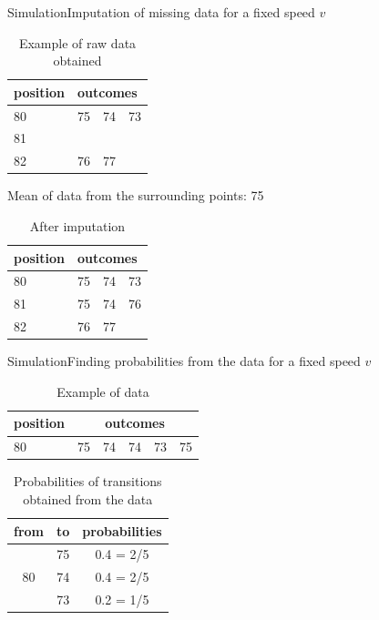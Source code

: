\documentclass[dvipsnames,svgnames]{beamer}
\begin{document}
\begin{frame}{Simulation}{Imputation of missing data for a fixed speed $v$}

\begin{table}[]
\centering
\caption{Example of raw data obtained}
\label{my-label}
\begin{tabular}{|l|l|l|l|}
\hline
position & \multicolumn{3}{l|}{outcomes} \\ \hline
80       & 75       & 74       & 73      \\ \hline
81       &          &          &         \\ \hline
82       & 76       & 77       &         \\ \hline
\end{tabular}
\end{table}

\pause 
Mean of data from the surrounding points: 75
\pause
\begin{table}[]
\centering
\caption{After imputation}
\label{my-label}
\begin{tabular}{|l|l|l|l|}
\hline
position & \multicolumn{3}{l|}{outcomes} \\ \hline
80       & 75       & 74       & 73      \\ \hline
81       & 75       & 74       &76        \\ \hline
82       & 76       & 77       &         \\ \hline
\end{tabular}
\end{table}
\end{frame}


\begin{frame}{Simulation}{Finding probabilities from the data for a fixed speed $v$}

\begin{table}[]
\centering
\caption{Example of data}
\begin{tabular}{|l|l|l|l|l|l|}
\hline
position & \multicolumn{5}{c|}{outcomes} \\ \hline
80       & 75   & 74  & 74  & 73  & 75  \\ \hline
\end{tabular}
\end{table}
\pause

\begin{table}[]
\centering
\caption{Probabilities of transitions obtained from the data}
\label{my-label}
\begin{tabular}{|c|c|c|}
\hline
from & to & probabilities \\ \hline
\multirow{3}{*}{80} & 75 & 0.4 = 2/5 \\ \cline{2-3} 
 & 74 & 0.4 = 2/5 \\ \cline{2-3} 
 & 73 &  0.2 = 1/5  \\ \hline
\end{tabular}
\end{table}

\end{frame}
\end{document}
